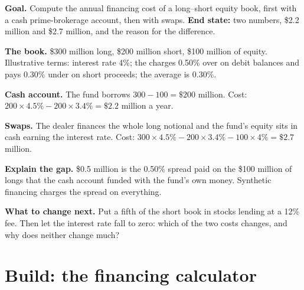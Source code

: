 \begin{tutorial}
\textbf{Goal.} Compute the annual financing cost of a long--short equity
book, first with a cash prime-brokerage account, then with swaps.
\textbf{End state:} two numbers, \$2.2 million and \$2.7 million, and the
reason for the difference.
\begin{tutsteps}
\item \textbf{The book.} \$300 million long, \$200 million short, \$100
million of equity. Illustrative terms: interest rate 4\%; the 
charges 0.50\% over on debit balances and pays 0.30\% under on short
proceeds; the average  is 0.30\%.
\item \textbf{Cash account.} The fund borrows $300 - 100 = \$200$ million.
\label{lst:m1:financing:cash}
Cost: $200 \times 4.5\% - 200 \times 3.4\% = \$2.2$ million a year.
\item \textbf{Swaps.} The dealer finances the whole long notional and the
fund's equity sits in cash earning the interest rate.
\label{lst:m1:financing:swap}
Cost: $300 \times 4.5\% - 200 \times 3.4\% - 100 \times 4\% = \$2.7$ million.
\item \textbf{Explain the gap.} \$0.5 million is the 0.50\% spread paid on
the \$100 million of longs that the cash account funded with the fund's own
money. Synthetic financing charges the spread on everything.
\end{tutsteps}
\textbf{What to change next.} Put a fifth of the short book in stocks
lending at a 12\% fee. Then let the interest rate fall to zero: which of the
two costs changes, and why does neither change much?
\end{tutorial}

\section{Build: the financing calculator}\label{bld:m1:financing:calc}

